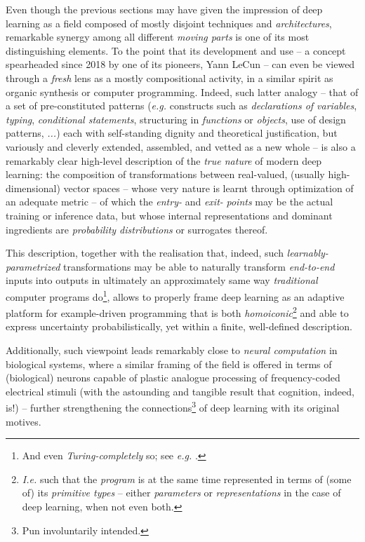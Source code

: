 Even though the previous sections may have given the impression of deep learning as a field composed of mostly disjoint techniques and \textit{architectures}, remarkable synergy among all different \textit{moving parts} is one of its most distinguishing elements. To the point that its development and use -- a concept spearheaded since 2018 by one of its pioneers, Yann LeCun -- can even be viewed through a \textit{fresh} lens as a mostly compositional activity, in a similar spirit as organic synthesis or computer programming. Indeed, such latter analogy -- that of a set of pre-constituted patterns (\textit{e.g.} constructs such as \textit{declarations of variables}, \textit{typing}, \textit{conditional statements}, structuring in \textit{functions} or \textit{objects}, use of design patterns, \textit{...}) each with self-standing dignity and theoretical justification, but variously and cleverly extended, assembled, and vetted as a new whole -- is also a remarkably clear high-level description of the \textit{true nature} of modern deep learning: the composition of transformations between real-valued, (usually high-dimensional) vector spaces -- whose very nature is learnt through optimization of an adequate metric -- of which the \textit{entry-} and \textit{exit-} \textit{points} may be the actual training or inference data, but whose internal representations and dominant ingredients are \textit{probability distributions} or surrogates thereof.

This description, together with the realisation that, indeed, such \textit{learnably-parametrized} transformations may be able to naturally transform \textit{end-to-end} inputs into outputs in ultimately an approximately same way \textit{traditional} computer programs do\footnote{And even \textit{Turing-completely} so; see \textit{e.g.} \cite{PerezEtAl2018Turing}.}, allows to properly frame deep learning as an adaptive platform for example-driven programming that is both \textit{homoiconic}\footnote{\textit{I.e.} such that the \textit{program} is at the same time represented in terms of (some of) its \textit{primitive types} -- either \textit{parameters} or \textit{representations} in the case of deep learning, when not even both.} and able to express uncertainty probabilistically, yet within a finite, well-defined description.

Additionally, such viewpoint leads remarkably close to \textit{neural computation} in biological systems, where a similar framing of the field is offered in terms of (biological) neurons capable of plastic analogue processing of frequency-coded electrical stimuli (with the astounding and tangible result that cognition, indeed, is!) -- further strengthening the connections\footnote{Pun involuntarily intended.} of deep learning with its original motives.

